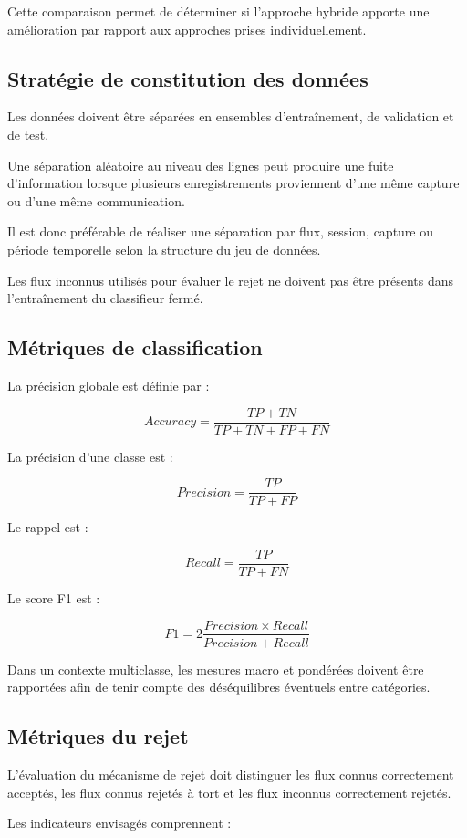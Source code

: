 Cette comparaison permet de déterminer si l'approche
hybride apporte une amélioration par rapport aux
approches prises individuellement.

\subsection{Stratégie de constitution des données}

Les données doivent être séparées en ensembles
d'entraînement, de validation et de test.

Une séparation aléatoire au niveau des lignes peut
produire une fuite d'information lorsque plusieurs
enregistrements proviennent d'une même capture
ou d'une même communication.

Il est donc préférable de réaliser une séparation
par flux, session, capture ou période temporelle
selon la structure du jeu de données.

Les flux inconnus utilisés pour évaluer le rejet
ne doivent pas être présents dans l'entraînement
du classifieur fermé.

\subsection{Métriques de classification}

La précision globale est définie par :

\[
Accuracy=
\frac{TP+TN}{TP+TN+FP+FN}
\]

La précision d'une classe est :

\[
Precision=
\frac{TP}{TP+FP}
\]

Le rappel est :

\[
Recall=
\frac{TP}{TP+FN}
\]

Le score F1 est :

\[
F1=
2\frac{Precision\times Recall}
{Precision+Recall}
\]

Dans un contexte multiclasse, les mesures macro
et pondérées doivent être rapportées afin de tenir
compte des déséquilibres éventuels entre catégories.

\subsection{Métriques du rejet}

L'évaluation du mécanisme de rejet doit distinguer
les flux connus correctement acceptés, les flux
connus rejetés à tort et les flux inconnus correctement
rejetés.

Les indicateurs envisagés comprennent :

